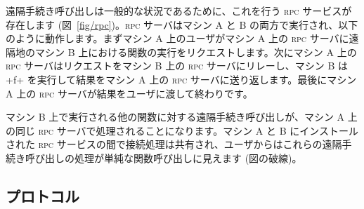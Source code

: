 遠隔手続き呼び出しは一般的な状況であるために、これを行う \textsc{rpc} サービスが存在します (図~\ref{fig/rpc})。\textsc{rpc} サーバはマシン A と B の両方で実行され、以下のように動作します。まずマシン A 上のユーザがマシン A 上の \textsc{rpc} サーバに遠隔地のマシン B 上における関数の実行をリクエストします。次にマシン A 上の \textsc{rpc} サーバはリクエストをマシン B 上の \textsc{rpc} サーバにリレーし、マシン B は \ml+f+ を実行して結果をマシン A 上の  \textsc{rpc} サーバに送り返します。最後にマシン A 上の \textsc{rpc} サーバが結果をユーザに渡して終わりです。

マシン B 上で実行される他の関数に対する遠隔手続き呼び出しが、マシン A 上の同じ \textsc{rpc} サーバで処理されることになります。マシン A と B にインストールされた \textsc{rpc} サービスの間で接続処理は共有され、ユーザからはこれらの遠隔手続き呼び出しの処理が単純な関数呼び出しに見えます (図の破線)。

\subsection*{ プロトコル}


